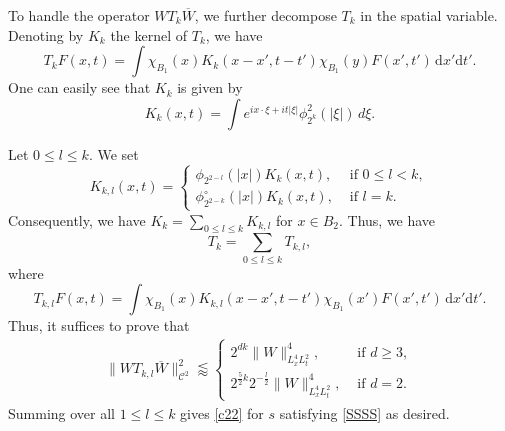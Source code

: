 \documentclass[a4paper]{amsart}
\numberwithin{figure}{section}
\numberwithin{equation}{section}%
\theoremstyle{plain}%
\theoremstyle{definition}
\theoremstyle{remark}%
\def\d{\mathrm{d}}
\def\C{\mathcal{C}}
\begin{document}
To handle  the operator $WT_k\overline{W}$, we further decompose $T_k$ in the spatial variable. 
Denoting by $K_k$ the kernel of $T_k$, we have 
$$
T_k F(x,t) = \int \chi_{B_1} (x) K_k(x - x', t-t') \chi_{B_1}(y) F(x',t')\, \d x'\d t'.
$$
One can easily see that  $K_k$ is  given by
\begin{equation}
\label{ker-k}
K_k(x,t) = \int e^{i x \cdot \xi + i t |\xi|} \phi_{2^{k}}^2(|\xi|)\, d\xi.
\end{equation} 


Let $0\le l\le k$. We set 
\[
K_{k,l}(x,t)= 
\begin{cases}
 \phi_{2^{2-l}}(|x|) K_k(x,t), &\text{ if }   0\le l<k, 
 \\[1ex]
 \phi_{2^{2-k}}^\circ(|x|) K_k(x,t), &\text{ if }   l=k. 
 \end{cases}
\] 
Consequently, we have $K_k = \sum_{0\le l \le k} K_{k,l}$ 
for $x\in B_2$. Thus, 
we have  
\[ T_k= \sum_{0 \le l \le k}T_{k,l},\] 
where
\[
T_{k,l}F(x,t) = \int  \chi_{B_1} (x) K_{k,l}(x-x',t-t') \chi_{B_1} (x')F(x',t')\,\d x'\d t'.
\]
Thus, it suffices to prove that
\begin{align}\label{final00}
    \|WT_{k,l}\overline{W}\|_{\C^2}^2
    \lessapprox
    \begin{cases}
	    2^{dk}\|W\|_{L_x^4L_t^2}^4,  &\text{ if } d\ge3,
	    \\[1ex]
    	    2^{\frac 52k}2^{-\frac l2}\|W\|_{L_x^4L_t^2}^4,  &\text{ if }  d=2.
    \end{cases}
\end{align}
Summing over all $1 \le l \le k$ gives \eqref{c22} for $s$ satisfying \eqref{SSSS} as desired.
\end{document}
